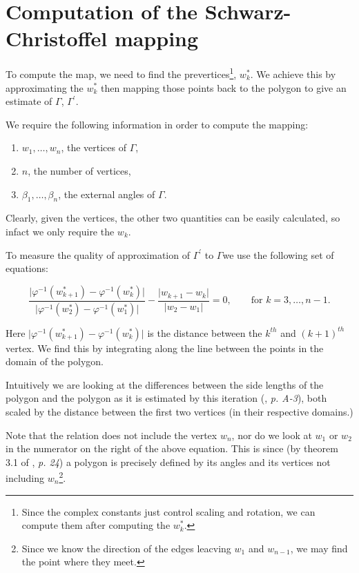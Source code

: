 \documentclass[a4paper,10pt]{amsart}
\newcommand{\sch}{Schwarz-Christoffel }
\newcommand{\phiinv}{\phi^{-1}}
\renewcommand{\phi}{\varphi}
\begin{document}
\section{Computation of the \sch mapping}

To compute the map, we need to find the prevertices\footnote{Since the complex constants just control scaling and rotation, we can compute them after computing the $w^*_k$.}, $w^*_k$. We achieve this by approximating the $w^*_k$ then mapping those points back to the polygon to give an estimate of $\Gamma$, $\Gamma^\prime$. 

We require the following information in order to compute the mapping: 

\begin{enumerate}
\item $w_1, \dots, w_n$, the vertices of $\Gamma$,
\item $n$, the number of vertices,
\item $\beta_1, \dots, \beta_n$, the external angles of $\Gamma$.
\end{enumerate}

Clearly, given the vertices, the other two quantities can be easily calculated, so infact we only require the $w_k$.

To measure the quality of approximation of $\Gamma^\prime$ to $\Gamma$we use the following set of equations:

\begin{equation}
\label{optimizeme}
\frac{\vert \phiinv(w^*_{k+1}) -  \phiinv(w^*_k) \vert}{\vert \phiinv(w^*_2)-\phiinv(w^*_1)\vert} - \frac{\vert w_{k+1} - w_k\vert}{\vert w_2 - w_1\vert} = 0, \qquad \text{for } k=3,\dots,n-1.
\end{equation}

Here $\vert \phiinv(w^*_{k+1}) -  \phiinv(w^*_k) \vert$ is the distance between the $k^{th}$ and $(k+1)^{th}$ vertex.  We find this by integrating along the line between the points in the domain of the polygon.

Intuitively we are looking at the differences between the side lengths of the polygon and the polygon as it is estimated by this iteration (\cite{snider}, \emph{p. A-3}), both scaled by the distance between the first two vertices (in their respective domains.)

Note that the relation does not include the vertex $w_n$, nor do we look at $w_1$ or $w_2$ in the numerator on the right of the above equation. This is since (by theorem 3.1 of \cite{driscoll}, \emph{p. 24}) a polygon is precisely defined by its angles and its vertices not including $w_n$\footnote{Since we know the direction of the edges leacving $w_1$ and $w_{n-1}$, we may find the point where they meet.}. 
\end{document}
